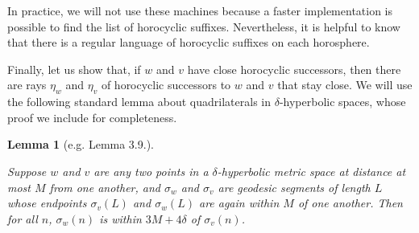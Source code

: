 \documentclass{amsart}
\newtheorem{lemma}[theorem]{Lemma}
\theoremstyle{definition}
\theoremstyle{remark}
\begin{document}
	In practice, we will not use these machines because a faster implementation is possible to find the list of horocyclic suffixes. Nevertheless, it is helpful to know that there is a regular language of horocyclic suffixes on each horosphere.
	
	Finally, let us show that, if $w$ and $v$ have close horocyclic successors, then there are rays $\eta_w$ and $\eta_v$ of horocyclic successors to $w$ and $v$ that stay close. We will use the following standard lemma about quadrilaterals in $\delta$-hyperbolic spaces, whose proof we include for completeness.
	
	\begin{lemma}[e.g. \cite{CGSR} Lemma 3.9.] \label{ThinAlmostBigons}
		
		Suppose $w$ and $v$ are any two points in a $\delta$-hyperbolic metric space at distance at most $M$ from one another, and $\sigma_w$ and $\sigma_v$ are geodesic segments of length $L$ whose endpoints $\sigma_v(L)$ and $\sigma_w(L)$ are again within $M$ of one another. Then for all $n$, $\sigma_w(n)$ is within $3M+4\delta$ of $\sigma_v(n)$. 
		
	\end{lemma}
	
\end{document}
